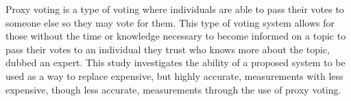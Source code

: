 %
%
%

\begin{publicabstract}

    Proxy voting is a type of voting where individuals are able to pass their votes to
    someone else so they may vote for them.
    This type of voting system allows for those without the time or knowledge necessary
    to become informed on a topic to pass their votes to an individual they trust who
    knows more about the topic, dubbed an expert.
    This study investigates the ability of a proposed system to be used as a way to
    replace expensive, but highly accurate, measurements with less expensive,
    though less accurate, measurements through the use of proxy voting.


\end{publicabstract}


